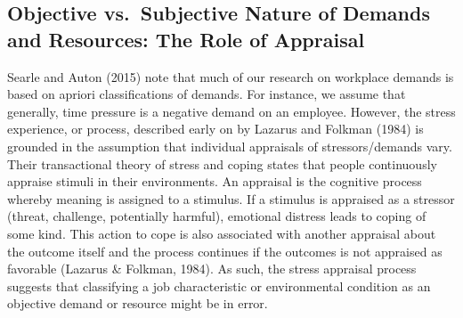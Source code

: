 \documentclass[
  english,
  man]{apa6}
\begin{document}
\hypertarget{objective-vs.-subjective-nature-of-demands-and-resources-the-role-of-appraisal}{%
\subsection{Objective vs.~Subjective Nature of Demands and Resources: The Role of Appraisal}\label{objective-vs.-subjective-nature-of-demands-and-resources-the-role-of-appraisal}}

Searle and Auton (2015) note that much of our research on workplace demands is based on apriori classifications of demands. For instance, we assume that generally, time pressure is a negative demand on an employee. However, the stress experience, or process, described early on by Lazarus and Folkman (1984) is grounded in the assumption that individual appraisals of stressors/demands vary. Their transactional theory of stress and coping states that people continuously appraise stimuli in their environments. An appraisal is the cognitive process whereby meaning is assigned to a stimulus. If a stimulus is appraised as a stressor (threat, challenge, potentially harmful), emotional distress leads to coping of some kind. This action to cope is also associated with another appraisal about the outcome itself and the process continues if the outcomes is not appraised as favorable (Lazarus \& Folkman, 1984). As such, the stress appraisal process suggests that classifying a job characteristic or environmental condition as an objective demand or resource might be in error.
\end{document}
